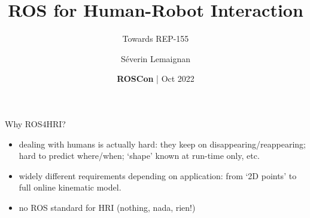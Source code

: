 \documentclass[xcolor=table,aspectratio=169]{beamer}
\title{\Large ROS for Human-Robot Interaction}
\subtitle{Towards REP-155}
\date{{\bf ROSCon} | Oct 2022}
\author{Séverin Lemaignan}
\institute{{\bf PAL Robotics} Senior Scientist AI \& Social Interactions}
\begin{document}




\maketitle
{}


%
%
%
%

{
\begin{frame}{Why ROS4HRI?}

    \begin{itemize}
        \item  dealing with humans is actually hard: they keep on disappearing/reappearing; hard to predict where/when; ‘shape’ known at run-time only, etc.

\item widely different requirements depending on application: from ‘2D points’ to full online kinematic model.

    \item no ROS standard for HRI (nothing, nada, rien!)
    \end{itemize}

\end{frame}
}
\end{document}
